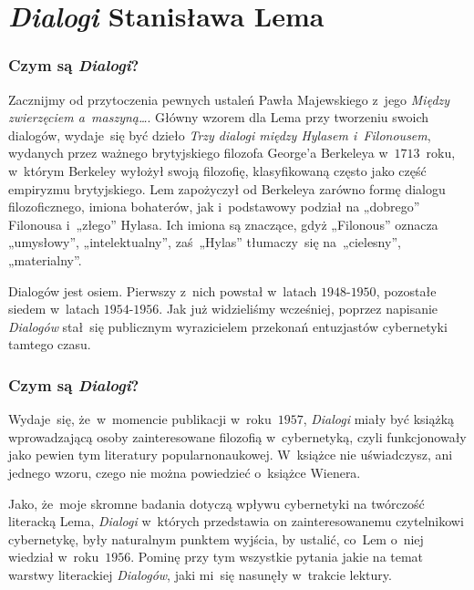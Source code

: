 \documentclass[10pt,t]{beamer}
\begin{document}
\section{\textit{Dialogi} Stanisława Lema}



\begin{frame}
  \frametitle{Czym są \textit{Dialogi}?}


  Zacznijmy od przytoczenia pewnych ustaleń Pawła Majewskiego z~jego
  \textit{Między zwierzęciem a~maszyną\ldots}. Główny wzorem dla Lema przy
  tworzeniu swoich dialogów, wydaje~się być dzieło \textit{Trzy dialogi
    między Hylasem i~Filonousem}, wydanych przez ważnego brytyjskiego
  filozofa George’a Berkeleya w~$1713$~roku, w~którym Berkeley wyłożył
  swoją filozofię, klasyfikowaną często jako część empiryzmu brytyjskiego.
  Lem zapożyczył od Berkeleya zarówno formę dialogu filozoficznego, imiona
  bohaterów, jak i~podstawowy podział na „dobrego” Filonousa i~„złego”
  Hylasa. Ich imiona są znaczące, gdyż „Filonous” oznacza „umysłowy”,
  „intelektualny”, zaś~„Hylas” tłumaczy~się na~„cielesny”, „materialny”.

  Dialogów jest osiem. Pierwszy z~nich powstał w~latach $1948\text{-}1950$,
  pozostałe siedem w~latach $1954\text{-}1956$. Jak już widzieliśmy
  wcześniej, poprzez napisanie \textit{Dialogów} stał~się publicznym
  wyrazicielem przekonań entuzjastów cybernetyki tamtego czasu.

\end{frame}





\begin{frame}
  \frametitle{Czym są \textit{Dialogi}?}


  Wydaje~się, że~w~momencie publikacji w~roku~$1957$, \textit{Dialogi} miały
  być książką wprowadzającą osoby zainteresowane filozofią w~cybernetyką,
  czyli funkcjonowały jako pewien tym literatury popularnonaukowej.
  W~książce nie uświadczysz, ani jednego wzoru, czego nie można powiedzieć
  o~książce Wienera.

  Jako, że~moje skromne badania dotyczą wpływu cybernetyki na twórczość
  literacką Lema, \textit{Dialogi} w~których przedstawia on zainteresowanemu
  czytelnikowi cybernetykę, były naturalnym punktem wyjścia, by ustalić,
  co~Lem o~niej wiedział w~roku~$1956$. Pominę przy tym wszystkie pytania
  jakie na temat warstwy literackiej \textit{Dialogów}, jaki mi~się
  nasunęły w~trakcie lektury.

\end{frame}
\end{document}
